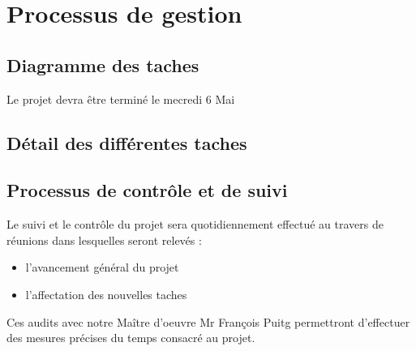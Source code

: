 \section{Processus de gestion}
\subsection{Diagramme des taches}

Le projet devra être terminé le mecredi 6 Mai

\subsection{Détail des différentes taches}


\subsection{Processus de contrôle et de suivi}

Le suivi et le contrôle du projet sera quotidiennement effectué au travers de réunions dans lesquelles seront relevés : 
\begin{itemize}
 \item l'avancement général du projet
 \item l'affectation des nouvelles taches
\end{itemize}

Ces audits avec notre Maître d’oeuvre Mr François Puitg permettront d'effectuer des mesures précises du temps consacré au projet.



